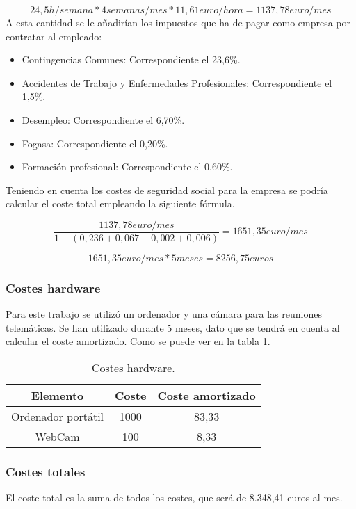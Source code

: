 \begin{equation}
	24,5h/semana * 4semanas/mes * 11,61euro/hora = 1137,78 euro/mes
\end{equation}
A esta cantidad se le añadirían los impuestos que ha de pagar como empresa por contratar al empleado:
\begin{itemize}
	\item Contingencias Comunes: Correspondiente el 23,6\%.
	 \item  Accidentes de Trabajo y Enfermedades Profesionales: Correspondiente el 1,5\%.
	 \item Desempleo: Correspondiente el 6,70\%.
	 \item Fogasa: Correspondiente el 0,20\%.
	 \item Formación profesional: Correspondiente el 0,60\%.
\end{itemize}

Teniendo en cuenta los costes de seguridad social para la empresa se podría calcular el coste total empleando la siguiente fórmula.

\begin{equation}
\dfrac{	1137,78 euro/mes}{1-(0,236 + 0,067 + 0,002 + 0,006 )} = 1651,35 euro/mes
\end{equation}

\begin{equation}
 1651,35 euro/mes * 5 meses = 8256,75 euros
\end{equation}

\subsubsection{Costes hardware}
Para este trabajo se utilizó un ordenador  y una cámara para las reuniones telemáticas. Se han utilizado durante 5 meses, dato que se tendrá en cuenta al calcular el coste amortizado. Como se puede ver en la tabla \ref{costes:hardware}.
\begin{table}
	\centering
\begin{tabular}{|c|c|c|}
	\hline
	\textbf{Elemento} & \textbf{Coste} &\textbf{ Coste amortizado} \\
	\hline
	Ordenador portátil  & 1000 & 83,33 \\
	\hline
	WebCam & 100 & 8,33 \\
	\hline
\end{tabular}
\caption{Costes hardware.}
\label{costes:hardware}
\end{table}
\subsubsection{Costes totales}
El coste total es la suma de todos los costes, que será de 8.348,41 euros al mes.
